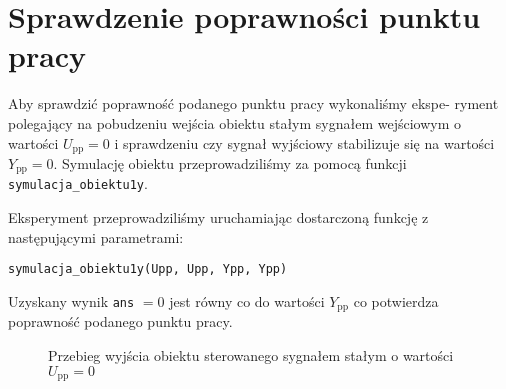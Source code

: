 \chapter{Sprawdzenie poprawności punktu pracy}
\label{pro1}

Aby sprawdzić poprawność podanego punktu pracy wykonaliśmy ekspe-
ryment polegający na pobudzeniu wejścia obiektu stałym sygnałem wejściowym o wartości
$U_{\mathrm{pp}} = \num{0}$ i sprawdzeniu czy sygnał wyjściowy stabilizuje się 
na wartości $Y_{\mathrm{pp}} = \num{0}$. Symulację obiektu przeprowadziliśmy
za pomocą funkcji \verb+symulacja_obiektu1y+. 

Eksperyment przeprowadziliśmy uruchamiając dostarczoną funkcję z następującymi parametrami:

\begin{center}
\verb+symulacja_obiektu1y(Upp, Upp, Ypp, Ypp)+ 
\end{center}

Uzyskany wynik \verb+ans+ $= \num{0}$ jest równy co do wartości $Y_{\mathrm{pp}}$ co potwierdza poprawność podanego
punktu pracy.

\vskip3cm

\begin{figure}[H]
    \centering
    \caption{Przebieg wyjścia obiektu sterowanego sygnałem stałym o wartości \mbox{$U_{\mathrm{pp}} = \num{0}$}}
    \label{pro1}
\end{figure}